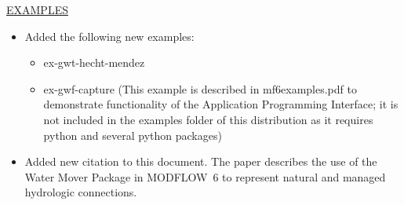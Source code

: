 	\underline{EXAMPLES}
	\begin{itemize}
	        \item Added the following new examples: 
	        \begin{itemize}
	          \item ex-gwt-hecht-mendez
	          \item ex-gwf-capture (This example is described in mf6examples.pdf to demonstrate functionality of the Application Programming Interface; it is not included in the examples folder of this distribution as it requires python and several python packages)
	        \end{itemize}
	        \item Added new citation to this document.  The \cite{morway2021} paper describes the use of the Water Mover Package in MODFLOW~6 to represent natural and managed hydrologic connections. 
	\end{itemize}

